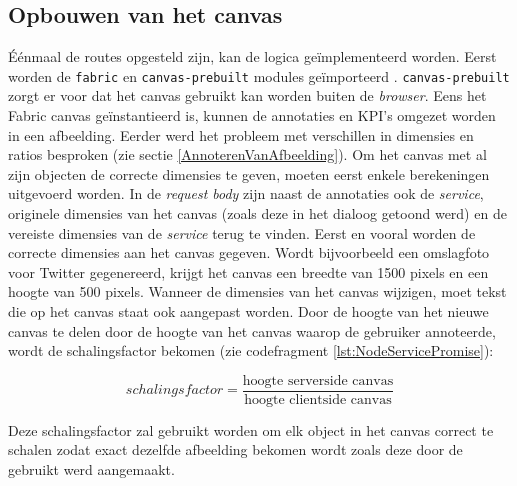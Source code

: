 \subsection{Opbouwen van het canvas} \label{OpbouwenCanvas}
\'{E}\'{e}nmaal de routes opgesteld zijn, kan de logica ge\"{i}mplementeerd worden. Eerst worden de \texttt{fabric} en \texttt{canvas-prebuilt} modules ge\"{i}mporteerd \cite{CanvasPrebuilt}. \texttt{canvas-prebuilt} zorgt er voor dat het canvas gebruikt kan worden buiten de \textit{browser}. Eens het Fabric canvas ge\"{i}nstantieerd is, kunnen de annotaties en KPI's omgezet worden in een afbeelding. Eerder werd het probleem met verschillen in dimensies en ratios besproken (zie sectie \ref{AnnoterenVanAfbeelding}). Om het canvas met al zijn objecten de correcte dimensies te geven, moeten eerst enkele berekeningen uitgevoerd worden. In de \textit{request body} zijn naast de annotaties ook de \textit{service}, originele dimensies van het canvas (zoals deze in het dialoog getoond werd) en de vereiste dimensies van de \textit{service} terug te vinden. Eerst en vooral worden de correcte dimensies aan het canvas gegeven. Wordt bijvoorbeeld een omslagfoto voor Twitter gegenereerd, krijgt het canvas een breedte van 1500 pixels en een hoogte van 500 pixels. Wanneer de dimensies van het canvas wijzigen, moet tekst die op het canvas staat ook aangepast worden. Door de hoogte van het nieuwe canvas te delen door de hoogte van het canvas waarop de gebruiker annoteerde, wordt de schalingsfactor bekomen (zie codefragment \ref{lst:NodeServicePromise}):  

\[ schalingsfactor = \frac{\text{hoogte serverside canvas}}{\text{hoogte clientside canvas}} \]

Deze schalingsfactor zal gebruikt worden om elk object in het canvas correct te schalen zodat exact dezelfde afbeelding bekomen wordt zoals deze door de gebruikt werd aangemaakt. 

